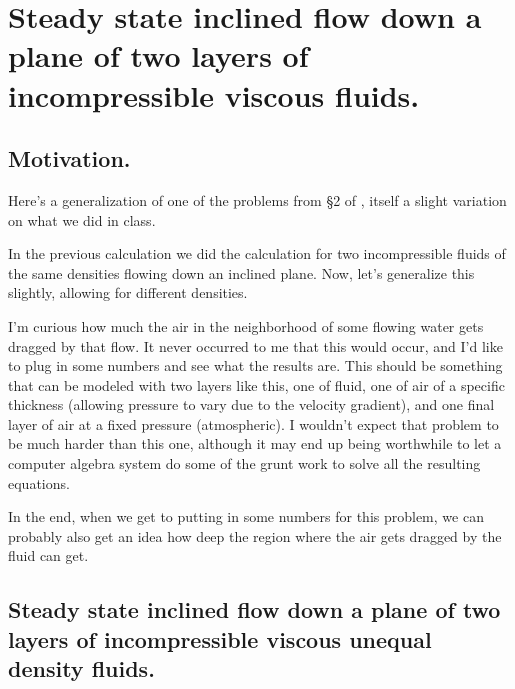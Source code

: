 %
%


\chapter{Steady state inclined flow down a plane of two layers of incompressible viscous fluids.}
\label{chap:twoLayerInclinedFlowDifferentDensities}
{}
\date{Mar 1, 2012}

\beginArtWithToc

\section{Motivation.}

Here's a generalization of one of the problems from \S 2 of \cite{acheson1990elementary}, itself a slight variation on what we did in class.

In the previous calculation we did the calculation for two incompressible fluids of the same densities flowing down an inclined plane.  Now, let's generalize this slightly, allowing for different densities.

I'm curious how much the air in the neighborhood of some flowing water gets dragged by that flow.  It never occurred to me that this would occur, and I'd like to plug in some numbers and see what the results are.  This should be something that can be modeled with two layers like this, one of fluid, one of air of a specific thickness (allowing pressure to vary due to the velocity gradient), and one final layer of air at a fixed pressure (atmospheric).  I wouldn't expect that problem to be much harder than this one, although it may end up being worthwhile to let a computer algebra system do some of the grunt work to solve all the resulting equations.

In the end, when we get to putting in some numbers for this problem, we can probably also get an idea how deep the region where the air gets dragged by the fluid can get.

\section{Steady state inclined flow down a plane of two layers of incompressible viscous unequal density fluids.}

